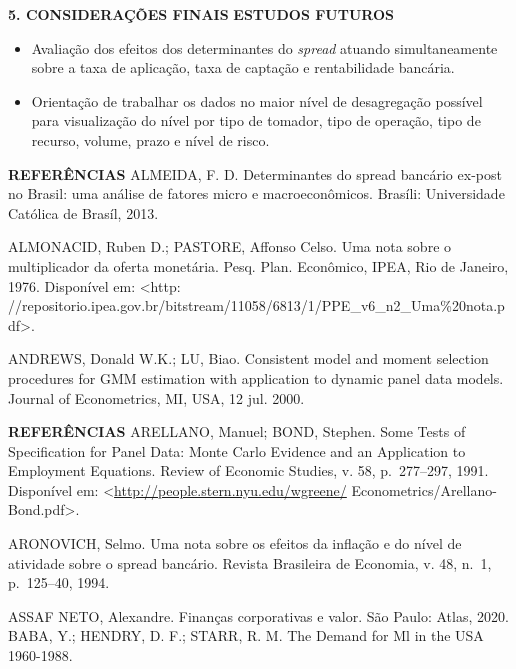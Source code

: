 \documentclass[
  ignorenonframetext,
  aspectratio=169,
  ignorenonframetext]{beamer}
\providecommand{\tightlist}{%
  \setlength{\itemsep}{0pt}\setlength{\parskip}{0pt}}
\begin{document}
\begin{frame}{\textbf{5. CONSIDERAÇÕES FINAIS}}
\protect\hypertarget{considerauxe7uxf5es-finais-8}{}
\textbf{ESTUDOS FUTUROS}

\begin{itemize}
\tightlist
\item
  Avaliação dos efeitos dos determinantes do \emph{spread} atuando
  simultaneamente sobre a taxa de aplicação, taxa de captação e
  rentabilidade bancária.
\item
  Orientação de trabalhar os dados no maior nível de desagregação
  possível para visualização do nível por tipo de tomador, tipo de
  operação, tipo de recurso, volume, prazo e nível de risco.
\end{itemize}
\end{frame}

\begin{frame}{\textbf{REFERÊNCIAS}}
\protect\hypertarget{referuxeancias}{}
ALMEIDA, F. D. Determinantes do spread bancário ex-post no Brasil: uma
análise de fatores micro e macroeconômicos. Brasíli: Universidade
Católica de Brasíl, 2013.

ALMONACID, Ruben D.; PASTORE, Affonso Celso. Uma nota sobre o
multiplicador da oferta monetária. Pesq. Plan. Econômico, IPEA, Rio de
Janeiro, 1976. Disponível em: \textless http:
//repositorio.ipea.gov.br/bitstream/11058/6813/1/PPE\_v6\_n2\_Uma\%20nota.pdf\textgreater.

ANDREWS, Donald W.K.; LU, Biao. Consistent model and moment selection
procedures for GMM estimation with application to dynamic panel data
models. Journal of Econometrics, MI, USA, 12 jul. 2000.
\end{frame}

\begin{frame}{\textbf{REFERÊNCIAS}}
\protect\hypertarget{referuxeancias-1}{}
ARELLANO, Manuel; BOND, Stephen. Some Tests of Specification for Panel
Data: Monte Carlo Evidence and an Application to Employment Equations.
Review of Economic Studies, v. 58, p.~277--297, 1991. Disponível em:
\textless{}\url{http://people.stern.nyu.edu/wgreene/}
Econometrics/Arellano-Bond.pdf\textgreater.

ARONOVICH, Selmo. Uma nota sobre os efeitos da inflação e do nível de
atividade sobre o spread bancário. Revista Brasileira de Economia, v.
48, n.~1, p.~125--40, 1994.

ASSAF NETO, Alexandre. Finanças corporativas e valor. São Paulo: Atlas,
2020. BABA, Y.; HENDRY, D. F.; STARR, R. M. The Demand for Ml in the USA
1960-1988.
\end{frame}
\end{document}
